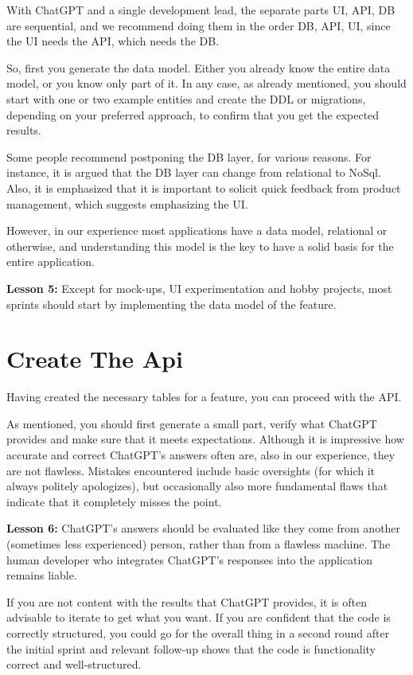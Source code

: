 \documentclass[runningheads]{llncs}
\begin{document}
With ChatGPT and a single development lead, the separate parts UI, API, DB are sequential, and we recommend doing them in the order DB, API, UI, since the UI needs the API, which needs the DB.

So, first you generate the data model. Either you already know the entire data model, or you know only part of it. In any case, as already mentioned, you should start with one or two example entities and create the DDL or migrations, depending on your preferred approach, to confirm that you get the expected results.

Some people recommend postponing the DB layer, for various reasons. For instance, it is argued that the DB layer can change from relational to NoSql. Also, it is emphasized that it is important to solicit quick feedback from product management, which suggests emphasizing the UI.

However, in our experience most applications have a data model, relational or otherwise, and understanding this model is the key to have a solid basis for the entire application.

\textbf{Lesson 5:} Except for mock-ups, UI experimentation and hobby projects, most sprints should start by implementing the data model of the feature.

\section{Create The Api}
Having created the necessary tables for a feature, you can proceed with the API.

As mentioned, you should first generate a small part, verify what ChatGPT provides and make sure that it meets expectations. Although it is impressive how accurate and
correct ChatGPT's answers often are, also in our experience, they are not flawless. Mistakes encountered include basic oversights (for which it always politely apologizes), but occasionally also more fundamental flaws that indicate that it completely misses the point.

\textbf{Lesson 6:} ChatGPT's answers should be evaluated like they come from another (sometimes less experienced) person, rather than from a flawless machine. The human developer who integrates ChatGPT's responses into the application remains liable.

If you are not content with the results that ChatGPT provides, it is often advisable to iterate to get what you want. If you are confident that the code is correctly structured, you could go for the overall thing in a second round after the initial sprint and relevant follow-up shows that the code is functionality correct and well-structured.
\end{document}
